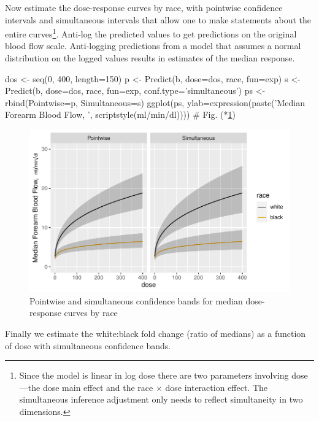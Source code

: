 Now estimate the dose-response curves by race, with pointwise 
confidence intervals and simultaneous intervals that allow one to make
statements about the entire curves\footnote{Since the model is linear in log dose there are two parameters involving dose---the dose main effect and the race $\times$ dose interaction effect.  The simultaneous inference adjustment only needs to reflect simultaneity in two dimensions.}.  Anti-log the predicted values to
get predictions on the original blood flow scale.  Anti-logging
predictions from a model that assumes a normal distribution on the
logged values results in estimates of the median response.
\begin{Schunk}
\begin{Sinput}
dos <- seq(0, 400, length=150)
p <- Predict(b, dose=dos, race, fun=exp)
s <- Predict(b, dose=dos, race, fun=exp, conf.type='simultaneous')
ps <- rbind(Pointwise=p, Simultaneous=s)
ggplot(ps, ylab=expression(paste('Median Forearm Blood Flow,  ',
                          scriptstyle(ml/min/dl))))   # Fig. (*\ref{fig:serial-glsd}\ipacue*)
\end{Sinput}
\begin{figure}[htbp]

\centerline{\includegraphics[width=\maxwidth]{serial-glsd-1} }

\caption[Confidence bands for median dose-response curves]{Pointwise and simultaneous confidence bands for median dose-response curves by race}\label{fig:serial-glsd}
\end{figure}
\end{Schunk}
Finally we estimate the white:black fold change (ratio of medians) as
a function of dose with simultaneous confidence bands.
